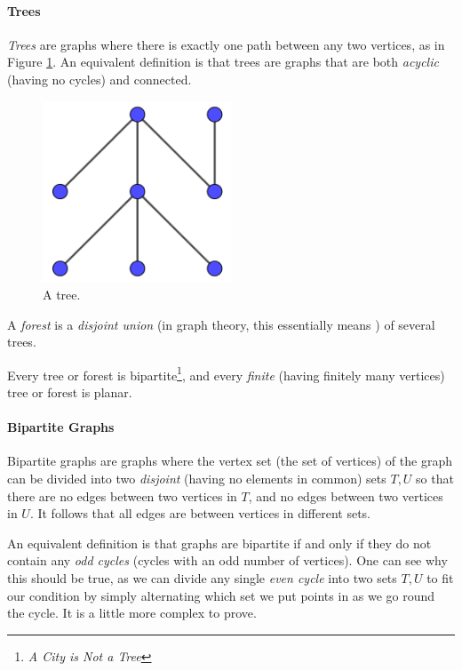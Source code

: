 \documentclass[11pt,a4paper]{report}
\begin{document}
\begin{adjustwidth}{5cm}{5cm}
\paragraph{Trees}

\textit{Trees} are graphs where there is exactly one path between any two vertices, as in Figure \ref{treegraph}. An equivalent definition is that trees are graphs that are both \textit{acyclic} (having no cycles) and connected.

\begin{figure}[h]
	\centering
	\includegraphics[width=0.5\textwidth]{treegraph}
	\caption{A tree.}
	\label{treegraph}
\end{figure}

A \textit{forest} is a \textit{disjoint union} (in graph theory, this essentially means ) of several trees.

Every tree or forest is bipartite\footnote{\textit{A City is Not a Tree}}, and every \textit{finite} (having finitely many vertices) tree or forest is planar\footnotemark[\ref{definedlater}].

\paragraph{Bipartite Graphs}

Bipartite graphs are graphs where the vertex set (the set of vertices) of the graph can be divided into two \textit{disjoint} (having no elements in common) sets \(T,U\) so that there are no edges between two vertices in \(T\), and no edges between two vertices in \(U\). It follows that all edges are between vertices in different sets.

An equivalent definition is that graphs are bipartite if and only if they do not contain any \textit{odd cycles} (cycles with an odd number of vertices). One can see why this should be true, as we can divide any single \textit{even cycle} into two sets \(T,U\) to fit our condition by simply alternating which set we put points in as we go round the cycle. It is a little more complex to prove.


\end{adjustwidth}
\end{document}

